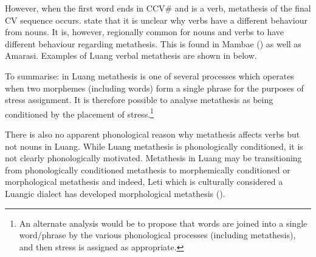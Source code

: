 \begin{exe}
	\label{ex:LuaVowDelEpe}
\end{exe}

However, when the first word ends in CCV{\#} and is a verb,
metathesis of the final CV sequence occurs.
\cite{tata15} state that it is unclear why verbs
have a different behaviour from nouns.
It is, however, regionally common for nouns and verbs to have different
behaviour regarding metathesis.
This is found in Mambae () as well as Amarasi.
Examples of Luang verbal metathesis are shown in  below.

\begin{exe}
	\label{ex:LuaMet}
\end{exe}

To summarise: in Luang metathesis is one of several processes
which operates when two morphemes (including words) form a single phrase
for the purposes of stress assignment.
It is therefore possible to analyse metathesis as being conditioned by the placement of stress.\footnote{
		An alternate analysis would be to propose that words are joined
		into a single word/phrase by the various
		phonological processes (including metathesis),
		and then stress is assigned as appropriate.}

There is also no apparent phonological reason why metathesis affects verbs but not nouns in Luang.
While Luang metathesis is phonologically conditioned,
it is not clearly phonologically motivated.
Metathesis in Luang may be transitioning from phonologically conditioned metathesis
to morphemically conditioned or morphological metathesis
and indeed, Leti which is culturally considered a Luangic dialect
has developed morphological metathesis ().